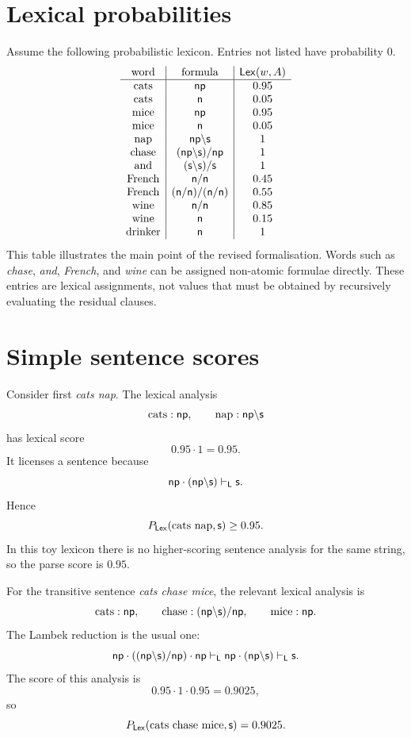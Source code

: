 \section{Lexical probabilities}
Assume the following probabilistic lexicon. Entries not listed have probability $0$.
\[
\begin{array}{c|c|c}
\text{word} & \text{formula} & \mathsf{Lex}(w,A)\\
\hline
\text{cats} & \mathsf{np} & 0.95\\
\text{cats} & \mathsf{n} & 0.05\\
\text{mice} & \mathsf{np} & 0.95\\
\text{mice} & \mathsf{n} & 0.05\\
\text{nap} & \mathsf{np}\backslash \mathsf{s} & 1\\
\text{chase} & (\mathsf{np}\backslash \mathsf{s})/\mathsf{np} & 1\\
\text{and} & (\mathsf{s}\backslash \mathsf{s})/\mathsf{s} & 1\\
\text{French} & \mathsf{n}/\mathsf{n} & 0.45\\
\text{French} & (\mathsf{n}/\mathsf{n})/(\mathsf{n}/\mathsf{n}) & 0.55\\
\text{wine} & \mathsf{n}/\mathsf{n} & 0.85\\
\text{wine} & \mathsf{n} & 0.15\\
\text{drinker} & \mathsf{n} & 1
\end{array}
\]
This table illustrates the main point of the revised formalisation. Words such as \emph{chase},
\emph{and}, \emph{French}, and \emph{wine} can be assigned non-atomic formulae directly. These
entries are lexical assignments, not values that must be obtained by recursively evaluating the
residual clauses.

\section{Simple sentence scores}
Consider first \emph{cats nap}. The lexical analysis
\[
\text{cats}:\mathsf{np},
\qquad
\text{nap}:\mathsf{np}\backslash \mathsf{s}
\]
has lexical score
\[
0.95\cdot 1 = 0.95.
\]
It licenses a sentence because
\[
\mathsf{np}\mathbin{\cdot}(\mathsf{np}\backslash \mathsf{s})\vdash_{\mathsf{L}}\mathsf{s}.
\]
Hence
\[
P_{\mathsf{Lex}}(\text{cats nap},\mathsf{s})\geq 0.95.
\]
In this toy lexicon there is no higher-scoring sentence analysis for the same string, so the parse
score is $0.95$.

For the transitive sentence \emph{cats chase mice}, the relevant lexical analysis is
\[
\text{cats}:\mathsf{np},
\qquad
\text{chase}:(\mathsf{np}\backslash \mathsf{s})/\mathsf{np},
\qquad
\text{mice}:\mathsf{np}.
\]
The Lambek reduction is the usual one:
\[
\mathsf{np}
\mathbin{\cdot} ((\mathsf{np}\backslash \mathsf{s})/\mathsf{np})
\mathbin{\cdot} \mathsf{np}
\vdash_{\mathsf{L}}
\mathsf{np}\mathbin{\cdot}(\mathsf{np}\backslash \mathsf{s})
\vdash_{\mathsf{L}}
\mathsf{s}.
\]
The score of this analysis is
\[
0.95\cdot1\cdot0.95=0.9025,
\]
so
\[
P_{\mathsf{Lex}}(\text{cats chase mice},\mathsf{s})=0.9025.
\]

